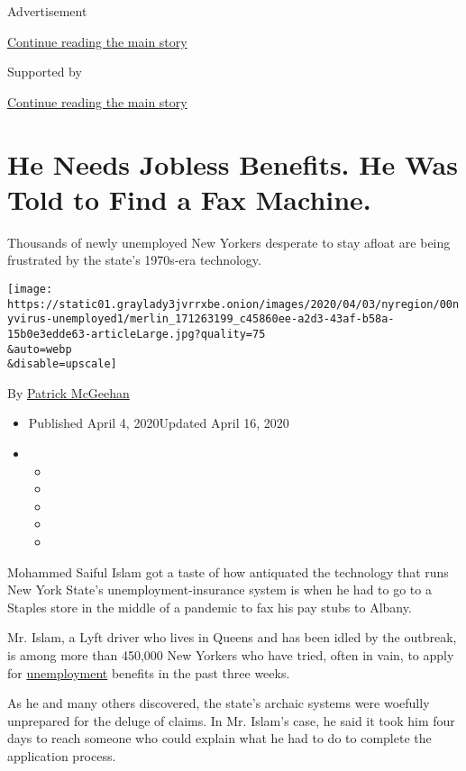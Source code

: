 Advertisement

\protect\hyperlink{after-top}{Continue reading the main story}

Supported by

\protect\hyperlink{after-sponsor}{Continue reading the main story}

\hypertarget{he-needs-jobless-benefits-he-was-told-to-find-a-fax-machine}{%
\section{He Needs Jobless Benefits. He Was Told to Find a Fax
Machine.}\label{he-needs-jobless-benefits-he-was-told-to-find-a-fax-machine}}

Thousands of newly unemployed New Yorkers desperate to stay afloat are
being frustrated by the state's 1970s-era technology.

\texttt{[image: https://static01.graylady3jvrrxbe.onion/images/2020/04/03/nyregion/00nyvirus-unemployed1/merlin\_171263199\_c45860ee-a2d3-43af-b58a-15b0e3edde63-articleLarge.jpg?quality=75\\\&auto=webp\\\&disable=upscale]}

By \href{https://www.nytimes3xbfgragh.onion/by/patrick-mcgeehan}{Patrick
McGeehan}

\begin{itemize}
\item
  Published April 4, 2020Updated April 16, 2020
\item
  \begin{itemize}
  \item
  \item
  \item
  \item
  \item
  \end{itemize}
\end{itemize}

Mohammed Saiful Islam got a taste of how antiquated the technology that
runs New York State's unemployment-insurance system is when he had to go
to a Staples store in the middle of a pandemic to fax his pay stubs to
Albany.

Mr. Islam, a Lyft driver who lives in Queens and has been idled by the
outbreak, is among more than 450,000 New Yorkers who have tried, often
in vain, to apply for
\href{https://www.nytimes3xbfgragh.onion/2020/04/16/us/california-unemployment-edd-coronavirus.html}{unemployment}
benefits in the past three weeks.

As he and many others discovered, the state's archaic systems were
woefully unprepared for the deluge of claims. In Mr. Islam's case, he
said it took him four days to reach someone who could explain what he
had to do to complete the application process.


